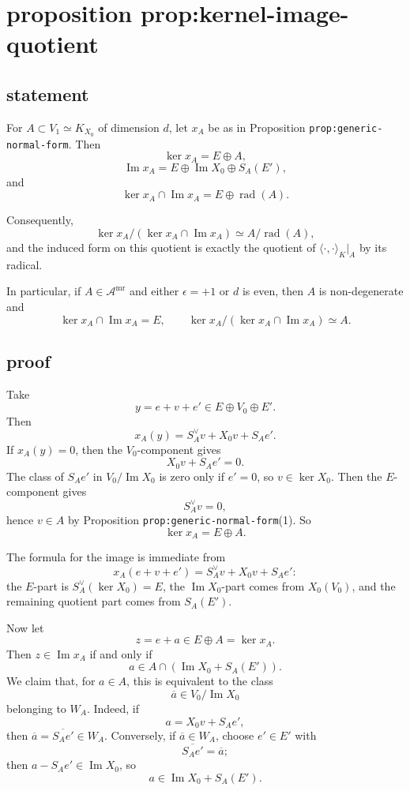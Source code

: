 \documentclass[
  11pt,
]{article}
\begin{document}
\section{proposition
prop:kernel-image-quotient}\label{proposition-propkernel-image-quotient}

\subsection{statement}\label{statement-5}

For \(A\subset V_1\simeq K_{X_0}\) of dimension \(d\), let \(x_A\) be as
in Proposition \texttt{prop:generic-normal-form}. Then \[
\ker x_A=E\oplus A,
\] \[
\operatorname{Im} x_A=E\oplus \operatorname{Im} X_0\oplus S_A(E'),
\] and \[
\ker x_A\cap \operatorname{Im} x_A = E\oplus \operatorname{rad}(A).
\]

Consequently, \[
\ker x_A/(\ker x_A\cap \operatorname{Im} x_A)\simeq A/\operatorname{rad}(A),
\] and the induced form on this quotient is exactly the quotient of
\(\langle\cdot,\cdot\rangle_K|_A\) by its radical.

In particular, if \(A\in \mathscr A^{\mathrm{mr}}\) and either
\(\epsilon=+1\) or \(d\) is even, then \(A\) is non-degenerate and \[
\ker x_A\cap \operatorname{Im} x_A = E,
\qquad
\ker x_A/(\ker x_A\cap \operatorname{Im} x_A)\simeq A.
\]

\subsection{proof}\label{proof-5}

Take \[
y=e+v+e'\in E\oplus V_0\oplus E'.
\] Then \[
x_A(y)=S_A^\vee v+X_0v+S_Ae'.
\] If \(x_A(y)=0\), then the \(V_0\)-component gives \[
X_0v+S_Ae'=0.
\] The class of \(S_Ae'\) in \(V_0/\operatorname{Im} X_0\) is zero only
if \(e'=0\), so \(v\in \ker X_0\). Then the \(E\)-component gives \[
S_A^\vee v=0,
\] hence \(v\in A\) by Proposition \texttt{prop:generic-normal-form}(1).
So \[
\ker x_A=E\oplus A.
\]

The formula for the image is immediate from \[
x_A(e+v+e')=S_A^\vee v+X_0v+S_Ae':
\] the \(E\)-part is \(S_A^\vee(\ker X_0)=E\), the
\(\operatorname{Im} X_0\)-part comes from \(X_0(V_0)\), and the
remaining quotient part comes from \(S_A(E')\).

Now let \[
z=e+a\in E\oplus A=\ker x_A.
\] Then \(z\in \operatorname{Im} x_A\) if and only if \[
a\in A\cap (\operatorname{Im} X_0+S_A(E')).
\] We claim that, for \(a\in A\), this is equivalent to the class \[
\overline a\in V_0/\operatorname{Im} X_0
\] belonging to \(W_A\). Indeed, if \[
a=X_0v+S_Ae',
\] then \(\overline a=\overline{S_Ae'}\in W_A\). Conversely, if
\(\overline a\in W_A\), choose \(e'\in E'\) with \[
\overline{S_Ae'}=\overline a;
\] then \(a-S_Ae'\in \operatorname{Im} X_0\), so \[
a\in \operatorname{Im} X_0+S_A(E').
\]
\end{document}
